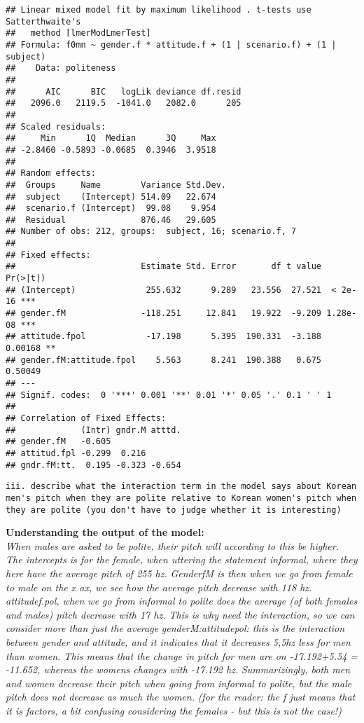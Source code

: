 \documentclass[
]{article}
\begin{document}
\begin{verbatim}
## Linear mixed model fit by maximum likelihood . t-tests use Satterthwaite's
##   method [lmerModLmerTest]
## Formula: f0mn ~ gender.f * attitude.f + (1 | scenario.f) + (1 | subject)
##    Data: politeness
## 
##      AIC      BIC   logLik deviance df.resid 
##   2096.0   2119.5  -1041.0   2082.0      205 
## 
## Scaled residuals: 
##     Min      1Q  Median      3Q     Max 
## -2.8460 -0.5893 -0.0685  0.3946  3.9518 
## 
## Random effects:
##  Groups     Name        Variance Std.Dev.
##  subject    (Intercept) 514.09   22.674  
##  scenario.f (Intercept)  99.08    9.954  
##  Residual               876.46   29.605  
## Number of obs: 212, groups:  subject, 16; scenario.f, 7
## 
## Fixed effects:
##                         Estimate Std. Error       df t value Pr(>|t|)    
## (Intercept)              255.632      9.289   23.556  27.521  < 2e-16 ***
## gender.fM               -118.251     12.841   19.922  -9.209 1.28e-08 ***
## attitude.fpol            -17.198      5.395  190.331  -3.188  0.00168 ** 
## gender.fM:attitude.fpol    5.563      8.241  190.388   0.675  0.50049    
## ---
## Signif. codes:  0 '***' 0.001 '**' 0.01 '*' 0.05 '.' 0.1 ' ' 1
## 
## Correlation of Fixed Effects:
##             (Intr) gndr.M atttd.
## gender.fM   -0.605              
## attitud.fpl -0.299  0.216       
## gndr.fM:tt.  0.195 -0.323 -0.654
\end{verbatim}

\begin{verbatim}
iii. describe what the interaction term in the model says about Korean men's pitch when they are polite relative to Korean women's pitch when they are polite (you don't have to judge whether it is interesting)  
\end{verbatim}

\textbf{Understanding the output of the model:}\\
\emph{When males are asked to be polite, their pitch will according to
this be higher.} \emph{The intercepts is for the female, when uttering
the statement informal, where they here have the average pitch of 255
hz.} \emph{GenderfM is then when we go from female to male on the x ax,
we see how the average pitch decrease with 118 hz.} \emph{attitudef.pol,
when we go from informal to polite does the average (of both females and
males) pitch decrease with 17 hz. This is why need the interaction, so
we can consider more than just the average} \emph{genderM:attitudepol:
this is the interaction between gender and attitude, and it indicates
that it decreases 5,5hz less for men than women. This means that the
change in pitch for men are on -17.192+5.54 = -11.652, whereas the
womens changes with -17.192 hz.} \emph{Summarizingly, both men and women
decrease their pitch when going from informal to polite, but the male
pitch does not decrease as much the women. } \emph{(for the reader: the
f just means that it is factors, a bit confusing considering the females
- but this is not the case!)}
\end{document}

